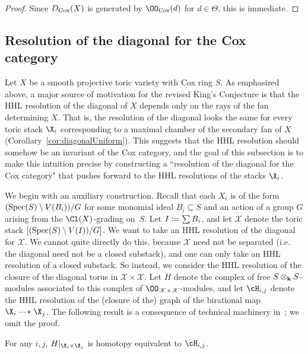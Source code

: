 \documentclass{amsart}
\begin{document}
\begin{proof}
Since $D_{\operatorname{Cox}}(X)$ is generated by $\OO_{\Cox}(d)$ for $d \in \Theta$, this is immediate.
\end{proof}


\subsection*{Resolution of the diagonal for the Cox category}
Let $X$ be a smooth projective toric variety with Cox ring $S$.
As emphasized above, a major source of motivation for the revised King's Conjecture is that the HHL resolution of the diagonal of $X$ depends only on the rays of the fan determining $X$. That is, the resolution of the diagonal looks the same for every toric stack $\X_i$ corresponding to a maximal chamber of the secondary fan of $X$ (Corollary~\ref{cor:diagonalUniform}). This suggests that the HHL resolution should somehow be an invariant of the Cox category, and the goal of this subsection is to make this intuition precise by constructing a ``resolution of the diagonal for the Cox category" that pushes forward to the HHL resolutions of the stacks $\X_i$.

We begin with an auxiliary construction. Recall that each $X_i$ is of the form $(\operatorname{Spec}(S) \setminus V(B_i)) / G$ for some monomial ideal $B_i \subseteq S$ and an action of a group $G$ arising from the $\Cl(X)$-grading on~$S$. Let $I \coloneqq \sum B_i$, and let $\mathscr{X}$ denote the toric stack $[(\operatorname{Spec}(S) \setminus V(I)) / G]$. We want to take an HHL resolution of the diagonal for $\mathscr{X}$. We cannot quite directly do this, because $\mathscr{X}$ need not be separated (i.e. the diagonal need not be a closed substack), and one can only take an HHL resolution of a closed substack. So instead, we consider the HHL resolution of the closure of the diagonal torus in $\mathscr{X} \times \mathscr{X}$. Let $H$ denote the complex of free $S \otimes_{\mathbf{k}} S$-modules associated to this complex of $\OO_{\mathscr{X} \times \mathscr{X}}$-modules, and let $\cH_{i, j}$ denote the HHL resolution of the (closure of the) graph of the birational map $\X_i \dashrightarrow \X_j$. The following result is a consequence of technical machinery in~\cite{HHL24}; we omit the proof.

\begin{prop}
\label{prop:homotopy}
For any $i, j$, $H|_{\X_i \times \X_j}$
is homotopy equivalent to $\cH_{i, j}$. %
\end{prop}
\end{document}
